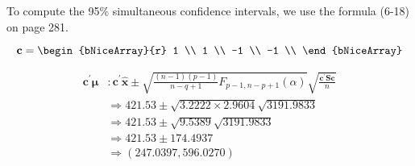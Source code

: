 To compute the 95\% simultaneous confidence intervals, we use the formula (6-18) on page 281.

\[
    \textbf{c}
    =
    \begin{bNiceArray}{r}
         1 \\
         1 \\
        -1 \\
        -1 \\
    \end{bNiceArray}
\]

\begin{align*}
    \textbf{c}^{\prime}\bm{\mu}
    & :
    \textbf{c}^{\prime}\hat{\textbf{x}}
    \pm
    \sqrt{\frac{(n-1)(p-1)}{n-q+1} F_{p-1, n-p+1} (\alpha)}
    \sqrt{\frac{\textbf{c}^{\prime}\textbf{S}\textbf{c}}{n}}
    \\
    & \Rightarrow
    421.53 \pm \sqrt{3.2222 \times 2.9604}\sqrt{3191.9833}
    \\
    & \Rightarrow
    421.53 \pm \sqrt{9.5389}\sqrt{3191.9833}
    \\
    & \Rightarrow
    421.53 \pm 174.4937 
    \\
    & \Rightarrow
    (247.0397, 596.0270) 
\end{align*}